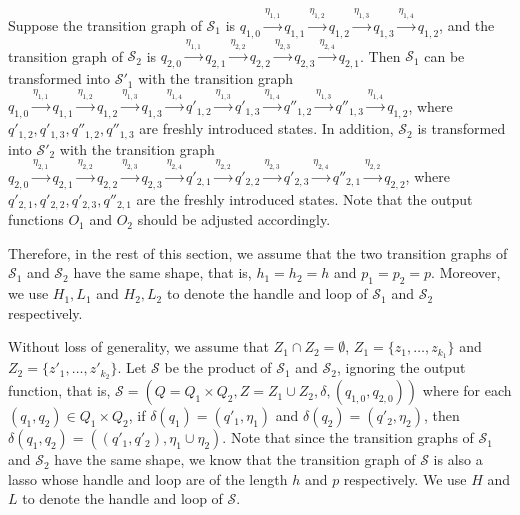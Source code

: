 \documentclass[runningheads,a4paper]{llncs}
\newcommand\Ss{\mathcal{S}}
\begin{document}
\begin{example}
Suppose the transition graph of $\Ss_1$ is $q_{1,0} \xrightarrow{\eta_{1,1}} q_{1, 1}  \xrightarrow{\eta_{1,2}} q_{1, 2} \xrightarrow{\eta_{1, 3}} q_{1, 3} \xrightarrow{\eta_{1, 4}} q_{1, 2}$, and the transition graph of $\Ss_2$ is 
$q_{2,0} \xrightarrow{\eta_{1,1}} q_{2, 1}  \xrightarrow{\eta_{2,2}} q_{2, 2} \xrightarrow{\eta_{2, 3}} q_{2, 3} \xrightarrow{\eta_{2, 4}} q_{2, 1}$. Then $\Ss_1$ can be transformed into $\Ss'_1$ with the transition graph $q_{1,0} \xrightarrow{\eta_{1,1}} q_{1, 1}  \xrightarrow{\eta_{1,2}} q_{1, 2} \xrightarrow{\eta_{1, 3}} q_{1, 3} \xrightarrow{\eta_{1, 4}} q'_{1, 2} \xrightarrow{\eta_{1, 3}} q'_{1, 3} \xrightarrow{\eta_{1, 4}} q''_{1, 2}  \xrightarrow{\eta_{1, 3}} q''_{1, 3} \xrightarrow{\eta_{1, 4}} q_{1, 2}$, where $q'_{1,2}, q'_{1, 3}, q''_{1, 2}, q''_{1, 3}$ are freshly introduced states. In addition, $\Ss_2$ is transformed into $\Ss'_2$ with the transition graph $q_{2,0} \xrightarrow{\eta_{2,1}} q_{2, 1}  \xrightarrow{\eta_{2,2}} q_{2, 2} \xrightarrow{\eta_{2, 3}} q_{2, 3} \xrightarrow{\eta_{2, 4}} q'_{2, 1} \xrightarrow{\eta_{2, 2}} q'_{2, 2} \xrightarrow{\eta_{2, 3}} q'_{2, 3}  \xrightarrow{\eta_{2, 4}} q''_{2, 1} \xrightarrow{\eta_{2, 2}} q_{2, 2}$, where $q'_{2,1}, q'_{2,2}, q'_{2,3}, q''_{2,1}$ are the freshly introduced states. Note that the output functions $O_1$  and $O_2$ should be adjusted accordingly.
\end{example}

Therefore, in the rest of this section, we assume that the two transition graphs of $\Ss_1$ and $\Ss_2$ have the same shape, that is, $h_1 = h_2 = h$ and $p_1 = p_2 = p$. Moreover, we use $H_1, L_1$ and $H_2,L_2$ to denote the handle and loop of $\Ss_1$ and $\Ss_2$ respectively.

Without loss of generality, we assume that $Z_1 \cap Z_2 = \emptyset$, $Z_1 = \{z_1, \dots, z_{k_1}\}$ and $Z_2 = \{z'_1,\dots, z'_{k_2}\}$. Let $\Ss$ be the product of $\Ss_1$ and $\Ss_2$, ignoring the output function, that is, $\Ss=(Q= Q_1 \times Q_2, Z= Z_1 \cup Z_2, \delta, (q_{1,0}, q_{2,0}))$ where for each $(q_1,q_2) \in Q_1 \times Q_2$, if $\delta(q_1)=(q'_1,\eta_1)$ and $\delta(q_2)=(q'_2, \eta_2)$, then $\delta(q_1, q_2)=((q'_1,q'_2), \eta_1 \cup \eta_2)$. Note that since the transition graphs of $\Ss_1$ and $\Ss_2$ have the same shape, we know that the transition graph of $\Ss$ is also a lasso whose handle and loop are of the length $h$ and $p$ respectively. We use $H$ and $L$ to denote the handle and loop of $\Ss$.
\end{document}
